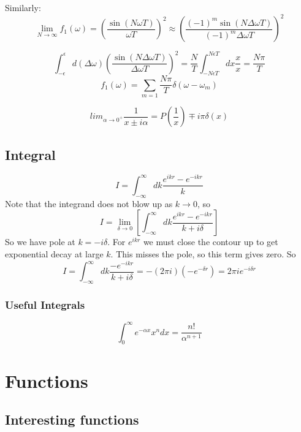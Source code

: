Similarly:
\begin{equation}
    \displaystyle \lim_{N\rightarrow\infty}f_1(\omega)=\left(\frac{\sin(N\omega T)}{\omega T}\right)^2
    \approx\left(\frac{(-1)^m\sin(N\Delta\omega T)}{(-1)^m\Delta\omega T}\right)^2
\end{equation}

\begin{equation}
    \int_{-\epsilon}^{\epsilon}d(\Delta\omega)\left(\frac{\sin(N\Delta\omega T)}{\Delta\omega T}\right)^2
    =\frac{N}{T}\int_{-N\epsilon T}^{N\epsilon T} dx\frac{x}{x}
    =\frac{N\pi}{T}
\end{equation}
\begin{equation}
    f_1(\omega)=\displaystyle \sum_{m=1}\frac{N\pi}{T}\delta({\omega-\omega_m})
\end{equation}


\begin{equation}
    \displaystyle lim_{\alpha\rightarrow 0^{+}}\frac{1}{x \pm i\alpha} = P\left(\frac{1}{x}\right) \mp i\pi\delta(x)
\end{equation}
\subsection{Integral}
\[
    I=\int_{-\infty}^{\infty}dk\frac{e^{ikr}-e^{-ikr}}{k}
    \]
Note that the integrand does not blow up as $k \rightarrow 0$, so
\[
    I=\displaystyle\lim_{\delta\rightarrow{0}}\left[\int_{-\infty}^{\infty}dk\frac{e^{ikr}-e^{-ikr}}{k+i\delta}\right]
    \]
So we have pole at $k = -i\delta$. For $e^{ikr}$ we must close the contour
up to get exponential decay at large $\mathit{k}$. This misses the pole, so
this term gives zero. So
\[
    I=\int_{-\infty}^{\infty}dk\frac{-e^{-ikr}}{k+i\delta}=-(2\pi{i})(-e^{-\delta{r}})=2\pi{i}e^{-i\delta{r}}
    \]

\subsubsection{Useful Integrals}
\[
    \int_0^\infty e^{-\alpha x}x^ndx = \frac{n!}{\alpha^{n+1}} 
    \]
\section{Functions}

\subsection{Interesting functions}
